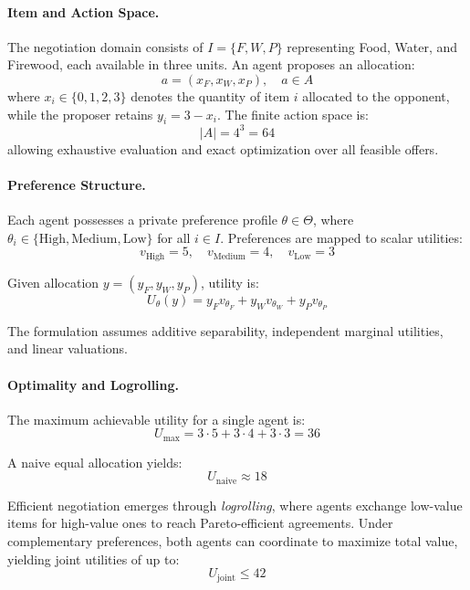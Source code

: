 \documentclass[11pt]{article}
\begin{document}
\paragraph{Item and Action Space.}
The negotiation domain consists of $I=\{F,W,P\}$ representing Food, Water, and Firewood, each available in three units. An agent proposes an allocation:
\begin{equation}
a = (x_F,x_W,x_P), \quad a \in A
\end{equation}
where $x_i \in \{0,1,2,3\}$ denotes the quantity of item $i$ allocated to the opponent, while the proposer retains $y_i = 3 - x_i$. The finite action space is:
\begin{equation}
|A| = 4^3 = 64
\end{equation}
allowing exhaustive evaluation and exact optimization over all feasible offers.

\paragraph{Preference Structure.}
Each agent possesses a private preference profile $\theta \in \Theta$, where $\theta_i \in \{\text{High},\text{Medium},\text{Low}\}$ for all $i \in I$. Preferences are mapped to scalar utilities:
\begin{equation}
v_{\text{High}}=5,\quad v_{\text{Medium}}=4,\quad v_{\text{Low}}=3
\end{equation}

Given allocation $y=(y_F,y_W,y_P)$, utility is:
\begin{equation}
U_\theta(y)=y_Fv_{\theta_F}+y_Wv_{\theta_W}+y_Pv_{\theta_P}
\end{equation}

The formulation assumes additive separability, independent marginal utilities, and linear valuations.

\paragraph{Optimality and Logrolling.}
The maximum achievable utility for a single agent is:
\begin{equation}
U_{\max} = 3 \cdot 5 + 3 \cdot 4 + 3 \cdot 3 = 36
\end{equation}

A naive equal allocation yields:
\begin{equation}
U_{\text{naive}} \approx 18
\end{equation}

Efficient negotiation emerges through \textit{logrolling}, where agents exchange low-value items for high-value ones to reach Pareto-efficient agreements. Under complementary preferences, both agents can coordinate to maximize total value, yielding joint utilities of up to:
\begin{equation}
U_{\text{joint}} \le 42
\end{equation}
\end{document}
